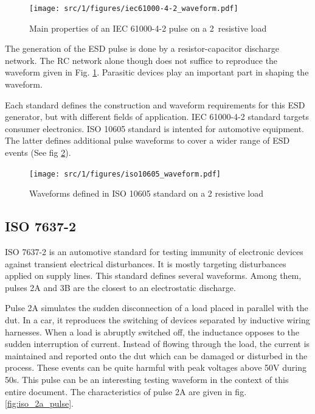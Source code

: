\begin{figure}[!h]
  \centering
  \texttt{[image: src/1/figures/iec61000-4-2\_waveform.pdf]}
  \caption{Main properties of an IEC 61000-4-2 pulse on a 2\textOmega\ resistive load}
  \label{iec_pulse}
\end{figure}

The generation of the ESD pulse is done by a resistor-capacitor discharge network.
The RC network alone though does not suffice to reproduce the waveform given in Fig. \ref{iec_pulse}.
Parasitic devices play an important part in shaping the waveform.

Each standard defines the construction and waveform requirements for this ESD generator, but with different fields of application.
IEC 61000-4-2\cite{iec61000-4-2} standard targets consumer electronics.
ISO 10605\cite{iso10605} standard is intented for automotive equipment.
The latter defines additional pulse waveforms to cover a wider range of ESD events (See fig \ref{iso_pulse}).

\begin{figure}[!h]
  \centering
  \texttt{[image: src/1/figures/iso10605\_waveform.pdf]}
  \caption{Waveforms defined in ISO 10605 standard on a 2\textOmega{} resistive load}
  \label{iso_pulse}
\end{figure}


\subsection{ISO 7637-2}

ISO 7637-2\cite{iso7637-2} is an automotive standard for testing immunity of electronic devices against transient electrical disturbances.
It is mostly targeting disturbances applied on supply lines.
This standard defines several waveforms.
Among them, pulses 2A and 3B are the closest to an electrostatic discharge.

Pulse 2A simulates the sudden disconnection of a load placed in parallel with the \gls{dut}.
In a car, it reproduces the switching of devices separated by inductive wiring harnesses.
When a load is abruptly switched off, the inductance opposes to the sudden interruption of current.
Instead of flowing through the load, the current is maintained and reported onto the \gls{dut} which can be damaged or disturbed in the process.
These events can be quite harmful with peak voltages above 50V during 50\textmu{}s.
This pulse can be an interesting testing waveform in the context of this entire document.
The characteristics of pulse 2A are given in fig. \ref{fig:iso_2a_pulse}.

